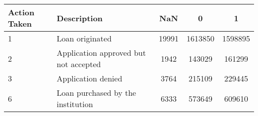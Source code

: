 \begin{tabular}{llccc}
  \hline
Action Taken & Description & NaN & 0 & 1 \\ 
  \hline
1 & Loan originated & 19991 & 1613850 & 1598895 \\ 
  2 & Application approved but not accepted & 1942 & 143029 & 161299 \\ 
  3 & Application denied & 3764 & 215109 & 229445 \\ 
  6 & Loan purchased by the institution & 6333 & 573649 & 609610 \\ 
   \hline
\end{tabular}

